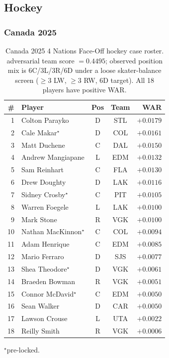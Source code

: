 \documentclass[11pt,letterpaper]{article}
\begin{document}
\subsection{Hockey}

\subsubsection{Canada 2025}

\begin{table}[h]
  \centering
  \small
  \caption{Canada 2025 4 Nations Face-Off hockey case roster.
    adversarial team score $= 0.4495$; observed position mix is
    6C/3L/3R/6D under a loose skater-balance screen ($\geq 3$ LW,
    $\geq 3$ RW, 6D target). All 18 players have positive WAR.}
  \begin{tabular}{r l c c r}
    \toprule
    \# & Player & Pos & Team & WAR \\
    \midrule
    1  & Colton Parayko     & D & STL & $+0.0179$ \\
    2  & Cale Makar$^{\star}$          & D & COL & $+0.0161$ \\
    3  & Matt Duchene       & C & DAL & $+0.0150$ \\
    4  & Andrew Mangiapane  & L & EDM & $+0.0132$ \\
    5  & Sam Reinhart       & C & FLA & $+0.0130$ \\
    6  & Drew Doughty       & D & LAK & $+0.0116$ \\
    7  & Sidney Crosby$^{\star}$       & C & PIT & $+0.0105$ \\
    8  & Warren Foegele     & L & LAK & $+0.0100$ \\
    9  & Mark Stone         & R & VGK & $+0.0100$ \\
    10 & Nathan MacKinnon$^{\star}$    & C & COL & $+0.0094$ \\
    11 & Adam Henrique      & C & EDM & $+0.0085$ \\
    12 & Mario Ferraro      & D & SJS & $+0.0077$ \\
    13 & Shea Theodore$^{\star}$       & D & VGK & $+0.0061$ \\
    14 & Braeden Bowman     & R & VGK & $+0.0051$ \\
    15 & Connor McDavid$^{\star}$      & C & EDM & $+0.0050$ \\
    16 & Sean Walker        & D & CAR & $+0.0050$ \\
    17 & Lawson Crouse      & L & UTA & $+0.0022$ \\
    18 & Reilly Smith       & R & VGK & $+0.0006$ \\
    \bottomrule
  \end{tabular}
  \par \footnotesize{$^{\star}$pre-locked.}
\end{table}
\end{document}
